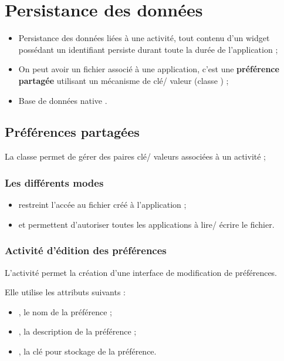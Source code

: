 \section{Persistance des données}
\begin{itemize}
    \item Persistance des données liées à une activité, tout contenu d'un widget possédant un identifiant persiste durant toute la durée de l'application ;
    \item On peut avoir un fichier associé à une application, c'est une \textbf{préférence partagée} utilisant un mécanisme de clé/ valeur (classe ) ;
    \item Base de données native .
\end{itemize}

\subsection{Préférences partagées}
La classe  permet de gérer des paires clé/ valeurs associées à un activité ;

\subsubsection{Les différents modes}
\begin{itemize}
    \item {} restreint l'accée au fichier créé à l'application ;
    \item {} et  permettent d'autoriser toutes les applications à lire/ écrire le fichier.
\end{itemize}

\subsubsection{Activité d'édition des préférences}
L'activité  permet la création d'une interface de modification de préférences.

Elle utilise les attributs suivants :
\begin{itemize}
    \item {}, le nom de la préférence ;
    \item {}, la description de la préférence ;
    \item {}, la clé pour stockage de la préférence.
\end{itemize}
